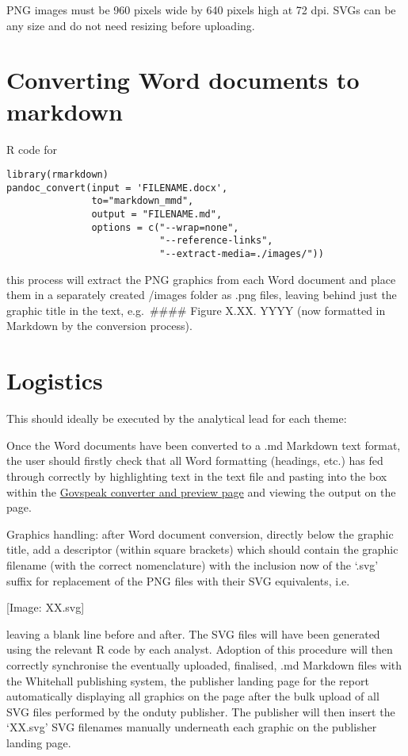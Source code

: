 \documentclass[
]{book}
\begin{document}
PNG images must be 960 pixels wide by 640 pixels high at 72 dpi.
SVGs can be any size and do not need resizing before uploading.

\hypertarget{converting-word-documents-to-markdown}{%
\section{Converting Word documents to markdown}\label{converting-word-documents-to-markdown}}

R code for

\begin{verbatim}
library(rmarkdown)
pandoc_convert(input = 'FILENAME.docx',
               to="markdown_mmd",
               output = "FILENAME.md", 
               options = c("--wrap=none",
                           "--reference-links",
                           "--extract-media=./images/"))
\end{verbatim}

this process will extract the PNG graphics from each Word document and place them in a separately created /images folder as .png files, leaving behind just the graphic title in the text, e.g.~\#\#\#\# Figure X.XX. YYYY (now formatted in Markdown by the conversion process).

\hypertarget{logistics}{%
\section{Logistics}\label{logistics}}

This should ideally be executed by the analytical lead for each theme:

Once the Word documents have been converted to a .md Markdown text format, the user should firstly check that all Word formatting (headings, etc.) has fed through correctly by highlighting text in the text file and pasting into the box within the \href{https://govspeak-preview.publishing.service.gov.uk/}{Govspeak converter and preview page} and viewing the output on the page.

Graphics handling: after Word document conversion, directly below the graphic title, add a descriptor (within square brackets) which should contain the graphic filename (with the correct nomenclature) with the inclusion now of the `.svg' suffix for replacement of the PNG files with their SVG equivalents, i.e.

{[}Image: XX.svg{]}

leaving a blank line before and after. The SVG files will have been generated using the relevant R code by each analyst. Adoption of this procedure will then correctly synchronise the eventually uploaded, finalised, .md Markdown files with the Whitehall publishing system, the publisher landing page for the report automatically displaying all graphics on the page after the bulk upload of all SVG files performed by the onduty publisher. The publisher will then insert the `XX.svg' SVG filenames manually underneath each graphic on the publisher landing page.
\end{document}
